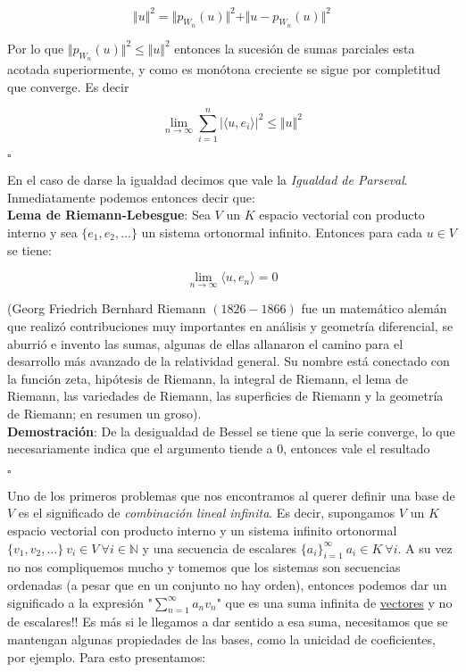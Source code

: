 \documentclass[a4paper,spanish]{article}
\def\N {\mathbb{N}}
\numberwithin{equation}{section}
\begin{document}
\[ \Vert{u}\Vert^2=\Vert{p_{W_{n}}\left({u}\right)}\Vert^2 + \Vert{u-p_{W_{n}}\left({u}\right)}\Vert^2\]

Por lo que $\Vert{p_{W_{n}}\left({u}\right)}\Vert ^2 \leq \Vert u\Vert ^2$ entonces la sucesi\'on de sumas parciales esta acotada superiormente, y como es mon\'otona creciente se sigue por completitud que converge. Es decir

\[ \lim \limits_{n \rightarrow \infty}{ \sum \limits_{i=1}^{n} {\vert{\langle{u,e_i}\rangle}\vert ^2}} \leq \Vert{u}\Vert^2 \]

\begin{flushright}
$\square$
\end{flushright}

En el caso de darse la igualdad decimos que vale la \textit{Igualdad de Parseval}. Inmediatamente podemos entonces decir que:\\

\textbf{Lema de Riemann-Lebesgue}: Sea $V$ un $K$ espacio vectorial con producto interno y sea $\lbrace{e_1,e_2,\dots}\rbrace$ un sistema ortonormal infinito. Entonces para cada $ u \in V $ se tiene:

\[\lim_{n \rightarrow \infty} {\langle{u,e_n}\rangle} =0 \]

(Georg Friedrich Bernhard Riemann $(1826 - 1866)$ fue un matem\'atico alem\'an que realiz\'o contribuciones muy importantes en an\'alisis y geometr\'ia diferencial, se aburri\'o e invento las sumas, algunas de ellas allanaron el camino para el desarrollo m\'as avanzado de la relatividad general. Su nombre est\'a conectado con la funci\'on zeta, hip\'otesis de Riemann, la integral de Riemann, el lema de Riemann, las variedades de Riemann, las superficies de Riemann y la geometr\'ia de Riemann; en resumen un groso).\\ 

\textbf{Demostraci\'on}: De la desigualdad de Bessel se tiene que la serie converge, lo que necesariamente indica que el argumento tiende a 0, entonces vale el resultado

\begin{flushright}
$\square$
\end{flushright}

Uno de los primeros problemas que nos encontramos al querer definir una base de $V$ es el significado de \textit{combinaci\'on lineal infinita}. Es decir, supongamos $V$ un $K$ espacio vectorial con producto interno y un sistema infinito ortonormal $\lbrace{v_1,v_2,\dots}\rbrace \ v_i \in V \ \forall i \in \N$ y una secuencia de escalares $\lbrace{a_i}\rbrace_{i=1}^{\infty} \ a_i \in K \ \forall i$. A su vez no nos compliquemos mucho y tomemos que los sistemas son secuencias ordenadas (a pesar que en un conjunto no hay orden), entonces podemos dar un significado a la expresi\'on "$\sum \limits _{n=1}^{\infty} {a_nv_n}$" que es una suma infinita de \underline{vectores} y no de escalares!! Es m\'as si le llegamos a dar sentido a esa suma, necesitamos que se mantengan algunas propiedades de las bases, como la unicidad de coeficientes, por ejemplo. Para esto presentamos:\\
\end{document}
